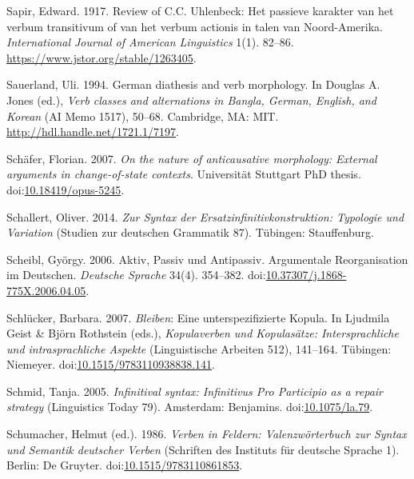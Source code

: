 \leavevmode{}%
Sapir, Edward. 1917. Review of {C.C. Uhlenbeck}: Het passieve karakter
van het verbum transitivum of van het verbum actionis in talen van
{Noord-Amerika}. \emph{International Journal of American Linguistics}
1(1). 82--86. \url{https://www.jstor.org/stable/1263405}.

\leavevmode{}%
Sauerland, Uli. 1994. German diathesis and verb morphology. In Douglas
A. Jones (ed.), \emph{Verb classes and alternations in {Bangla},
{German}, {English}, and {Korean}} (AI Memo 1517), 50--68. Cambridge,
MA: MIT. \url{http://hdl.handle.net/1721.1/7197}.

\leavevmode{}%
Schäfer, Florian. 2007. \emph{On the nature of anticausative morphology:
External arguments in change-of-state contexts}. Universität Stuttgart
PhD thesis.
doi:\href{https://doi.org/10.18419/opus-5245}{10.18419/opus-5245}.

\leavevmode{}%
Schallert, Oliver. 2014. \emph{Zur {Syntax} der
{Ersatzinfinitivkonstruktion}: {Typologie} und {Variation}} (Studien
{zur deutschen} Grammatik 87). Tübingen: Stauffenburg.

\leavevmode{}%
Scheibl, György. 2006. Aktiv, {Passiv} und {Antipassiv}. {Argumentale
Reorganisation} im {Deutschen}. \emph{Deutsche Sprache} 34(4). 354--382.
doi:\href{https://doi.org/10.37307/j.1868-775X.2006.04.05}{10.37307/j.1868-775X.2006.04.05}.

\leavevmode{}%
Schlücker, Barbara. 2007. \emph{Bleiben}: Eine unterspezifizierte
{Kopula}. In Ljudmila Geist \& Björn Rothstein (eds.),
\emph{Kopulaverben und {Kopulasätze}: {Intersprachliche} und
intrasprachliche {Aspekte}} (Linguistische Arbeiten 512), 141--164.
Tübingen: Niemeyer.
doi:\href{https://doi.org/10.1515/9783110938838.141}{10.1515/9783110938838.141}.

\leavevmode{}%
Schmid, Tanja. 2005. \emph{Infinitival syntax: {Infinitivus Pro
Participio} as a repair strategy} (Linguistics Today 79). Amsterdam:
Benjamins. doi:\href{https://doi.org/10.1075/la.79}{10.1075/la.79}.

\leavevmode{}%
Schumacher, Helmut (ed.). 1986. \emph{Verben in {Feldern}:
{Valenzwörterbuch} zur {Syntax} und {Semantik} deutscher {Verben}}
({Schriften des Instituts für deutsche Sprache} 1). Berlin: De Gruyter.
doi:\href{https://doi.org/10.1515/9783110861853}{10.1515/9783110861853}.

